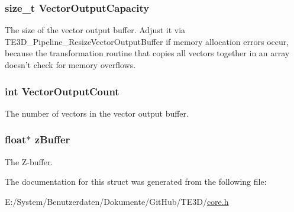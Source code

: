 \hypertarget{struct_t_e3_d___pipeline_a6372ef48448fcdf753e0ae30212feef6}{
\subsubsection[{Vector\-Output\-Capacity}]{\setlength{\rightskip}{0pt plus 5cm}size\-\_\-t Vector\-Output\-Capacity}}\label{struct_t_e3_d___pipeline_a6372ef48448fcdf753e0ae30212feef6}
The size of the vector output buffer. Adjust it via T\-E3\-D\-\_\-\-Pipeline\-\_\-\-Resize\-Vector\-Output\-Buffer if memory allocation errors occur, because the transformation routine that copies all vectors together in an array doesn't check for memory overflows. \hypertarget{struct_t_e3_d___pipeline_ae10862edd986d72d19291e85965282f6}{
\subsubsection[{Vector\-Output\-Count}]{\setlength{\rightskip}{0pt plus 5cm}int Vector\-Output\-Count}}\label{struct_t_e3_d___pipeline_ae10862edd986d72d19291e85965282f6}


The number of vectors in the vector output buffer. 

\hypertarget{struct_t_e3_d___pipeline_a627615edd455b5791a70b97c531d8942}{
\subsubsection[{z\-Buffer}]{\setlength{\rightskip}{0pt plus 5cm}float$\ast$ z\-Buffer}}\label{struct_t_e3_d___pipeline_a627615edd455b5791a70b97c531d8942}


The Z-\/buffer. 



The documentation for this struct was generated from the following file\-:\begin{DoxyCompactItemize}
\item 
E\-:/\-System/\-Benutzerdaten/\-Dokumente/\-Git\-Hub/\-T\-E3\-D/\hyperlink{core_8h}{core.\-h}\end{DoxyCompactItemize}
